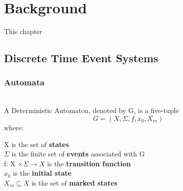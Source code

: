 
\chapter{Background}
\label{cha:background}
This chapter 
 
\section{Discrete Time Event Systems}
\label{sec:discreteEventTimeSystems}

\subsection{Automata}
\label{sec:automata}
\begin{definition}
\label{def:DeterministicAutomaton}~\\  
A Deterministic Automaton, denoted by G, is a five-tuple
\[ G = (X,\Sigma,f, x_0,X_m)\]
where:

\indent X is the set of \textbf{states} \\
\indent $\Sigma$ is the finite set of \textbf{events} associated with G\\
\indent f: X $\times \Sigma \rightarrow X$ is the \textbf{transition function}  \\ 
\indent $x_0$ is the \textbf{initial state} \\
\indent $X_m \subseteq X $ is the set of \textbf{marked states}

\end{definition}
